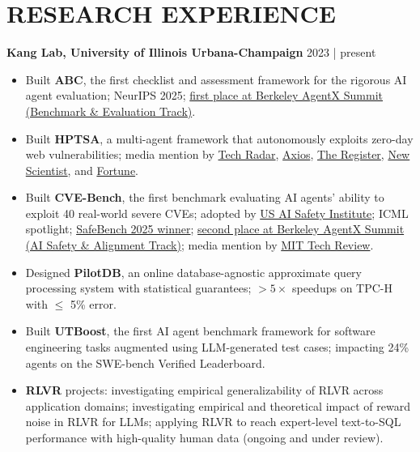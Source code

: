 \documentclass[a4paper,9pt]{extarticle}
\begin{document}
\section*{RESEARCH EXPERIENCE}
\noindent
\textbf{Kang Lab, University of Illinois Urbana-Champaign} \hfill 2023 | present 
\begin{itemize}
    \item Built \textbf{ABC}, the first checklist and assessment framework for the rigorous AI agent evaluation; NeurIPS 2025; \href{https://rdi.berkeley.edu/agentx/}{first place at Berkeley AgentX Summit (Benchmark \& Evaluation Track)}.
    \item Built \textbf{HPTSA}, a multi-agent framework that autonomously exploits zero-day web vulnerabilities; media mention by \href{https://www.techradar.com/pro/could-chatgpt-be-the-next-big-cybersecurity-worry-researchers-say-it-can-crack-systems-faster-than-ever-before}{Tech Radar}, \href{https://www.axios.com/2024/04/26/ai-model-hacking-security-vulnerabilities}{Axios}, \href{https://www.theregister.com/2024/04/17/gpt4_can_exploit_real_vulnerabilities/}{The Register}, \href{https://www.newscientist.com/article/2418201-gpt-4-developer-tool-can-hack-websites-without-human-help/}{New Scientist}, and \href{https://fortune.com/crypto/2023/05/04/artificial-intelligence-zero-knowledge-proofs-zkml-verify-ai/}{Fortune}.
    \item Built \textbf{CVE-Bench}, the first benchmark evaluating AI agents’ ability to exploit 40 real-world severe CVEs; adopted by \href{https://github.com/usnistgov/aisi-cyber-evals}{US AI Safety Institute}; ICML spotlight; \href{https://www.mlsafety.org/safebench/winners}{SafeBench 2025 winner}; \href{https://rdi.berkeley.edu/agentx/}{second place at Berkeley AgentX Summit (AI Safety \& Alignment Track)}; media mention by \href{https://www.technologyreview.com/2025/04/04/1114228/cyberattacks-by-ai-agents-are-coming/}{MIT Tech Review}.
    \item Designed \textbf{PilotDB}, an online database-agnostic approximate query processing system with statistical guarantees; $>5\times$ speedups on TPC-H with $\le$ 5\% error.
    \item Built \textbf{UTBoost}, the first AI agent benchmark framework for software engineering tasks augmented using LLM-generated test cases; impacting 24\% agents on the SWE-bench Verified Leaderboard.
    \item \textbf{RLVR} projects: investigating empirical generalizability of RLVR across application domains; investigating empirical and theoretical impact of reward noise in RLVR for LLMs; applying RLVR to reach expert-level text-to-SQL performance with high-quality human data (ongoing and under review).
\end{itemize}
\end{document}
